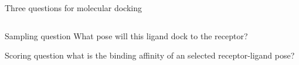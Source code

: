 \begin{frame}{Three questions for molecular docking}
\begin{columns}[T]
\begin{column}{.55\textwidth}
    \begin{block}{Sampling question}
What pose will this ligand dock to the receptor?
    \end{block}   
    \pause
    \begin{block}{Scoring question}
what is the binding affinity of an  selected receptor-ligand pose?\\

\end{block}
\end{column}
\end{columns}
\end{frame}
